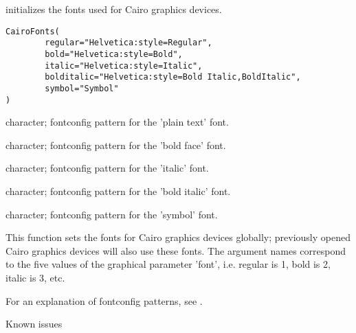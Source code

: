 \begin{Description}\relax
{} initializes the fonts used for Cairo graphics devices.
\end{Description}
\begin{Usage}
\begin{verbatim}
CairoFonts(
        regular="Helvetica:style=Regular",
        bold="Helvetica:style=Bold",
        italic="Helvetica:style=Italic",
        bolditalic="Helvetica:style=Bold Italic,BoldItalic",
        symbol="Symbol"
)
\end{verbatim}
\end{Usage}
\begin{Arguments}
\begin{ldescription}
\item[\code{regular}] character; fontconfig pattern for the 'plain text' font.
\item[\code{bold}] character; fontconfig pattern for the 'bold face' font.
\item[\code{italic}] character; fontconfig pattern for the 'italic' font.
\item[\code{bolditalic}] character; fontconfig pattern for the 'bold italic' font.
\item[\code{symbol}] character; fontconfig pattern for the 'symbol' font.
\end{ldescription}
\end{Arguments}
\begin{Details}\relax
This function sets the fonts for Cairo graphics devices globally; previously opened
Cairo graphics devices will also use these fonts. The argument names correspond to 
the five values of the graphical parameter 'font', i.e. regular is 1, bold is 2, italic 
is 3, etc.

For an explanation of fontconfig patterns, see .
\end{Details}
\begin{Section}{Known issues}
\end{Section}
